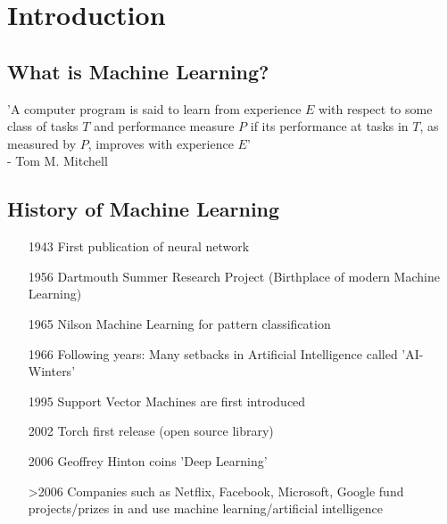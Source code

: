 \section{Introduction}
\label{sec:introduction}
\subsection{What is Machine Learning?}
\label{subsec:introduction-definition}
\begin{frame}{\insertsubsection}
    'A computer program is said to learn from experience $E$ with respect to some class of tasks $T$ and performance measure $P$ if its performance at tasks in $T$, as measured by $P$, improves with experience $E$'\\
    - Tom M. Mitchell~\cite{Mitchell1997}
\end{frame}
%
%
\subsection{History of Machine Learning}
\label{subsec:introduction-history}
\begin{frame}{\insertsubsection}
    \begin{itemize}[<+->]
        \item[1943] First publication of neural network~\cite{McCulloch1943}
        \item[1956] Dartmouth Summer Research Project (Birthplace of modern Machine Learning)
        \item[1965] Nilson Machine Learning for pattern classification~\cite{Nilsson1965}
        \item[1966] Following years: Many setbacks in Artificial Intelligence called 'AI-Winters'
        \item[1995] Support Vector Machines are first introduced
        \item[2002] Torch first release (open source library)
        \item[2006] Geoffrey Hinton coins 'Deep Learning'~\cite{Hinton2006}
        \item[>2006] Companies such as Netflix, Facebook, Microsoft, Google fund projects/prizes in and use machine learning/artificial intelligence
    \end{itemize}
\end{frame}
%
%
